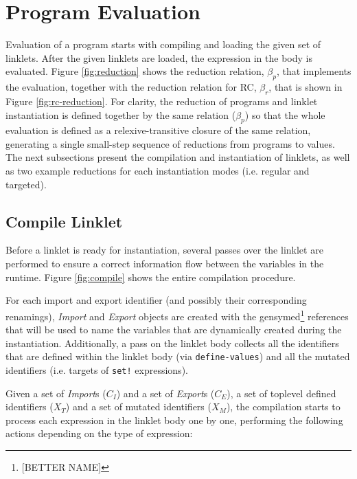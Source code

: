 \documentclass[sigplan,screen,anonymous]{acmart}
\def\dash {\text{-}}
\begin{document}
\section{Program Evaluation}

Evaluation of a program starts with compiling and loading the given
set of linklets. After the given linklets are loaded, the expression
in the body is evaluated. Figure \ref{fig:reduction} shows the
reduction relation, $\beta_p$, that implements the evaluation, together
with the reduction relation for RC, $\beta_r$, that is shown in Figure
\ref{fig:rc-reduction}. For clarity, the reduction of programs and
linklet instantiation is defined together by the same relation ($\beta_p$)
so that the whole evaluation is defined as a relexive-transitive
closure of the same relation, generating a single small-step sequence
of reductions from programs to values. The next subsections present
the compilation and instantiation of linklets, as well as two example
reductions for each instantiation modes (i.e. regular and targeted).

\subsection{Compile Linklet}
\label{sec:compile-linklet}

Before a linklet is ready for instantiation, several passes over the
linklet are performed to ensure a correct information flow between the
variables in the run\dash time. Figure \ref{fig:compile} shows the
entire compilation procedure.

For each import and export identifier (and possibly their
corresponding renamings), \textit{Import} and \textit{Export} objects
are created with the gensymed\footnote{[BETTER NAME]} references that
will be used to name the variables that are dynamically created during
the instantiation. Additionally, a pass on the linklet body collects
all the identifiers that are defined within the linklet body (via
\verb|define-values|) and all the mutated identifiers (i.e. targets of
\verb|set!| expressions).

Given a set of \textit{Import}s ($\mathit{C_I}$) and a set of
\textit{Export}s ($\mathit{C_E}$), a set of toplevel defined
identifiers ($\mathit{X_T}$) and a set of mutated identifiers
($\mathit{X_M}$), the compilation starts to process each expression in
the linklet body one by one, performing the following actions
depending on the type of expression:
\end{document}
